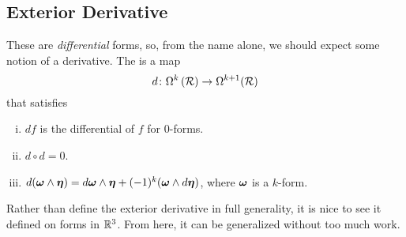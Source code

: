 \subsection{Exterior Derivative}

These are \emph{differential} forms, so, from the name alone, we should expect some notion of a derivative.  The  is a map
\[
d\colon \Omega^k\left(\mathcal{R}\right) \to \Omega^{k+1}(\mathcal{R})
\]
that satisfies
\begin{enumerate}[(i)]
    \item $df$ is the differential of $f$ for 0-forms.
    \item $d\circ d=0$.
    \item $d(\boldsymbol{\omega} \wedge \boldsymbol{\eta})=d\boldsymbol{\omega} \wedge \boldsymbol{\eta} + (-1)^k(\boldsymbol{\omega} \wedge d\boldsymbol{\eta})$, where $\boldsymbol{\omega}$ is a $k$-form.
\end{enumerate}
Rather than define the exterior derivative in full generality, it is nice to see it defined on forms in $\mathbb{R}^3$.  From here, it can be generalized without too much work.  

